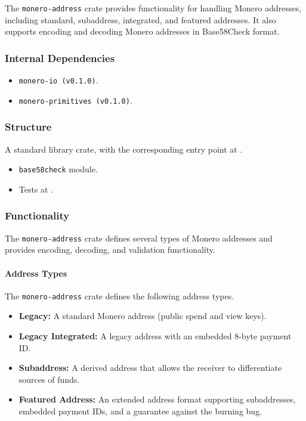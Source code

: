 The \texttt{monero-address} crate provides functionality for handling Monero addresses, including standard, subaddress, integrated, and featured addresses.  It also supports encoding and decoding Monero addresses in Base58Check format.  

\subsubsection{Internal Dependencies}

\begin{itemize}
    \item \texttt{monero-io (v0.1.0)}.  
    \item \texttt{monero-primitives (v0.1.0)}.  
\end{itemize}

\subsubsection{Structure}

A standard library crate, with the corresponding entry point at .  

\begin{itemize}
    \item \texttt{base58check} module.  
    \item Tests at .  
\end{itemize}

\subsubsection{Functionality}

The \texttt{monero-address} crate defines several types of Monero addresses and provides encoding, decoding, and validation functionality.  

\paragraph{Address Types}

The \texttt{monero-address} crate defines the following address types.  

\begin{itemize}
    \item \textbf{Legacy:} A standard Monero address (public spend and view keys).  
    \item \textbf{Legacy Integrated:} A legacy address with an embedded 8-byte payment ID.  
    \item \textbf{Subaddress:} A derived address that allows the receiver to differentiate sources of funds.  
    \item \textbf{Featured Address:} An extended address format supporting subaddresses, embedded payment IDs, and a guarantee against the burning bug.  
\end{itemize}

